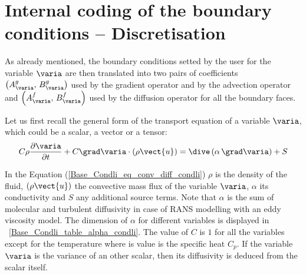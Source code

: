 \section{Internal coding of the boundary conditions -- Discretisation}

As already mentioned, the boundary conditions setted by the user for the variable $\varia$
are then translated into two pairs of coefficients $\left( A^g_\varia , \, B^g_\varia\right)$ used by the gradient operator and by the advection operator and $\left( A^f_\varia , \, B^f_\varia\right)$ used by the diffusion operator for all the boundary faces.

Let us first recall the general form of the transport equation of a variable $\varia$, which could be a scalar, 
a vector or a tensor: 
\begin{equation}\label{Base_Condli_eq_conv_diff_condli}
\displaystyle C \rho \frac{\partial \varia}{\partial t} + C \grad \varia \cdot \left( \rho \vect{u} \right) = \dive \left(\displaystyle\alpha \, \grad \varia \right) +S
\end{equation}

In the Equation (\ref{Base_Condli_eq_conv_diff_condli})
$\rho$ is the density of the fluid, $\left( \rho \vect{u} \right)$ the convective mass flux of the variable $\varia$, $\alpha$ its
conductivity and $S$ any additional source terms. 
Note that $\alpha$ is the sum of molecular and turbulent diffusivity in case of RANS modelling with an eddy viscosity model. 
The dimension of $\alpha$ for different variables is displayed in \tablename~\ref{Base_Condli_table_alpha_condli}.
The value of $C$ is $1$ for all the variables except for the temperature where is value is the specific heat $C_p$.
If the variable $\varia$ is the variance of an other scalar, then its diffusivity
is deduced from the scalar itself. 

